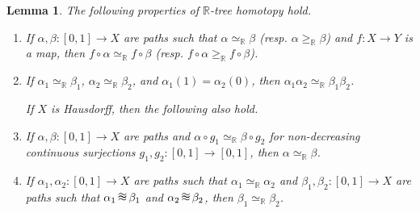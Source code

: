 \documentclass[12pt, leqno]{amsart}
\newcommand{\tripproxs}{\,\setbox0\hbox{$\approx$}%
\mbox{\makebox[0pt][l]{\raisebox{0.48\ht0}{$\approx$}}$\approx$}\,}
\newcommand{\ui}{[0,1]}
\newcommand{\den}{\simeq_{\bbr}}
\newcommand{\bbr}{\mathbb{R}}
\newtheorem{lemma}[theorem]{Lemma}
\theoremstyle{definition}\newtheorem{definition}[theorem]{Definition}
\begin{document}
\begin{lemma}\label{denproperties}
The following properties of $\bbr$-tree homotopy hold.
\begin{enumerate}
\item If $\alpha,\beta:\ui\to X$ are paths such that $\alpha\den\beta$ (resp. $\alpha\geq_{\bbr}\beta$) and $f:X\to Y$ is a map, then $f\circ\alpha\den f\circ \beta$ (resp. $f\circ\alpha\geq_{\bbr}f\circ \beta$).
\item If $\alpha_1\den\beta_1$, $\alpha_2\den\beta_2$, and $\alpha_1(1)=\alpha_2(0)$, then $\alpha_1\alpha_2\den \beta_1\beta_2$.

\hspace{-5em}  If $X$ is Hausdorff, then the following also hold.

\item If $\alpha,\beta:\ui\to X$ are paths and $\alpha\circ g_1\den \beta\circ g_2$ for non-decreasing continuous surjections $g_1,g_2:\ui\to\ui$, then $\alpha\den\beta$.
\item If $\alpha_1,\alpha_2:\ui\to X$ are paths such that $\alpha_1\den\alpha_2$ and $\beta_1,\beta_2:\ui\to X$ are paths such that $\alpha_1\tripproxs\beta_1$ and $\alpha_2\tripproxs\beta_2$, then $\beta_1\den\beta_2$.
\end{enumerate}
\end{lemma}
\end{document}

